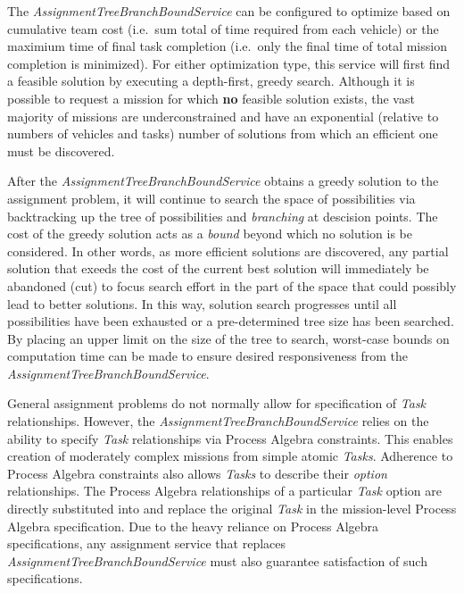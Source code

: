 The \emph{AssignmentTreeBranchBoundService} can be configured to
optimize based on cumulative team cost (i.e.~sum total of time required
from each vehicle) or the maximium time of final task completion
(i.e.~only the final time of total mission completion is minimized). For
either optimization type, this service will first find a feasible
solution by executing a depth-first, greedy search. Although it is
possible to request a mission for which \textbf{no} feasible solution
exists, the vast majority of missions are underconstrained and have an
exponential (relative to numbers of vehicles and tasks) number of
solutions from which an efficient one must be discovered.

After the \emph{AssignmentTreeBranchBoundService} obtains a greedy
solution to the assignment problem, it will continue to search the space
of possibilities via backtracking up the tree of possibilities and
\emph{branching} at descision points. The cost of the greedy solution
acts as a \emph{bound} beyond which no solution is be considered. In
other words, as more efficient solutions are discovered, any partial
solution that exeeds the cost of the current best solution will
immediately be abandoned (cut) to focus search effort in the part of the
space that could possibly lead to better solutions. In this way,
solution search progresses until all possibilities have been exhausted
or a pre-determined tree size has been searched. By placing an upper
limit on the size of the tree to search, worst-case bounds on
computation time can be made to ensure desired responsiveness from the
\emph{AssignmentTreeBranchBoundService}.

General assignment problems do not normally allow for specification of
\emph{Task} relationships. However, the
\emph{AssignmentTreeBranchBoundService} relies on the ability to specify
\emph{Task} relationships via Process Algebra constraints. This enables
creation of moderately complex missions from simple atomic \emph{Tasks}.
Adherence to Process Algebra constraints also allows \emph{Tasks} to
describe their \emph{option} relationships. The Process Algebra
relationships of a particular \emph{Task} option are directly
substituted into and replace the original \emph{Task} in the
mission-level Process Algebra specification. Due to the heavy reliance
on Process Algebra specifications, any assignment service that replaces
\emph{AssignmentTreeBranchBoundService} must also guarantee satisfaction
of such specifications.

